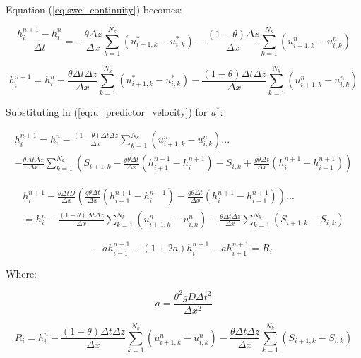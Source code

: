 \documentclass[12pt]{article}
\begin{document}
Equation (\ref{eq:swe_continuity}) becomes:

\begin{equation*}
\frac{h_{i}^{n+1} - h_i^n}{\Delta t} = - \frac{\theta \Delta z}{\Delta x} \sum_{k=1}^{N_k} (u_{i+1,k}^* - u_{i,k}^*) -  \frac{(1-\theta) \Delta z}{\Delta x} \sum_{k=1}^{N_k} (u_{i+1,k}^n - u_{i,k}^n)
\end{equation*}

\begin{equation} \label{eq:h_update}
h_{i}^{n+1} = h_i^n - \frac{\theta \Delta t \Delta z}{\Delta x} \sum_{k=1}^{N_k} (u_{i+1,k}^* - u_{i,k}^*) -  \frac{(1-\theta) \Delta t \Delta z}{\Delta x} \sum_{k=1}^{N_k} (u_{i+1,k}^n - u_{i,k}^n)
\end{equation}

Substituting in (\ref{eq:u_predictor_velocity}) for $u^*$:

\begin{multline*}
h_{i}^{n+1} = h_i^n  - \frac{(1-\theta) \Delta t \Delta z}{\Delta x} \sum_{k=1}^{N_k} (u_{i+1,k}^n - u_{i,k}^n) ...
\\ 
- \frac{\theta \Delta t \Delta z}{\Delta x} \sum_{k=1}^{N_k} \left( S_{i+1,k} - \frac{g \theta \Delta t}{\Delta x} (h_{i+1}^{n+1} - h_{i}^{n+1}) - S_{i,k} + \frac{g \theta \Delta t}{\Delta x} (h_{i}^{n+1} - h_{i-1}^{n+1}) \right)
\end{multline*}

\begin{multline*}
h_{i}^{n+1} - \frac{\theta \Delta t D}{\Delta x} \left(\frac{g \theta \Delta t}{\Delta x} (h_{i+1}^{n+1} - h_{i}^{n+1}) - \frac{g \theta \Delta t}{\Delta x} (h_{i}^{n+1} - h_{i-1}^{n+1}) \right) ... 
\\= h_i^n  - \frac{(1-\theta) \Delta t \Delta z}{\Delta x} \sum_{k=1}^{N_k} (u_{i+1,k}^n - u_{i,k}^n) - \frac{\theta \Delta t \Delta z}{\Delta x} \sum_{k=1}^{N_k} ( S_{i+1,k} - S_{i,k} )
\end{multline*}

\begin{equation*}
-a h_{i-1}^{n+1} + (1+2a) h_i^{n+1} -a h_{i+1}^{n+1} = R_i
\end{equation*}

Where:

\begin{equation*}
a = \frac{\theta^2 g D \Delta t^2}{\Delta x^2}
\end{equation*}

\begin{equation*}
R_i = h_i^n  - \frac{(1-\theta) \Delta t \Delta z}{\Delta x} \sum_{k=1}^{N_k} (u_{i+1,k}^n - u_{i,k}^n) - \frac{\theta \Delta t \Delta z}{\Delta x} \sum_{k=1}^{N_k} ( S_{i+1,k} - S_{i,k} )
\end{equation*}
\end{document}
